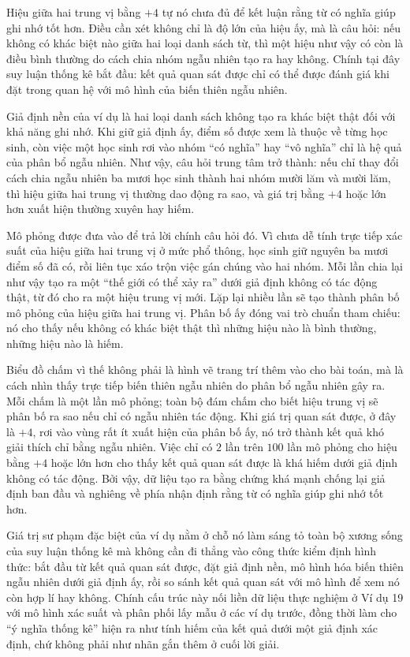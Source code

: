   {
    Hiệu giữa hai trung vị bằng $+4$ tự nó chưa đủ để kết luận rằng từ có nghĩa giúp ghi nhớ tốt hơn. Điều cần xét không chỉ là độ lớn của hiệu ấy, mà là câu hỏi: nếu không có khác biệt nào giữa hai loại danh sách từ, thì một hiệu như vậy có còn là điều bình thường do cách chia nhóm ngẫu nhiên tạo ra hay không. Chính tại đây suy luận thống kê bắt đầu: kết quả quan sát được chỉ có thể được đánh giá khi đặt trong quan hệ với mô hình của biến thiên ngẫu nhiên. 

    Giả định nền của ví dụ là hai loại danh sách không tạo ra khác biệt thật đối với khả năng ghi nhớ. Khi giữ giả định ấy, điểm số được xem là thuộc về từng học sinh, còn việc một học sinh rơi vào nhóm ``có nghĩa'' hay ``vô nghĩa'' chỉ là hệ quả của phân bổ ngẫu nhiên. Như vậy, câu hỏi trung tâm trở thành: nếu chỉ thay đổi cách chia ngẫu nhiên ba mươi học sinh thành hai nhóm mười lăm và mười lăm, thì hiệu giữa hai trung vị thường dao động ra sao, và giá trị bằng $+4$ hoặc lớn hơn xuất hiện thường xuyên hay hiếm. 

    Mô phỏng được đưa vào để trả lời chính câu hỏi đó. Vì chưa dễ tính trực tiếp xác suất của hiệu giữa hai trung vị ở mức phổ thông, học sinh giữ nguyên ba mươi điểm số đã có, rồi liên tục xáo trộn việc gán chúng vào hai nhóm. Mỗi lần chia lại như vậy tạo ra một “thế giới có thể xảy ra” dưới giả định không có tác động thật, từ đó cho ra một hiệu trung vị mới. Lặp lại nhiều lần sẽ tạo thành phân bố mô phỏng của hiệu giữa hai trung vị. Phân bố ấy đóng vai trò chuẩn tham chiếu: nó cho thấy nếu không có khác biệt thật thì những hiệu nào là bình thường, những hiệu nào là hiếm.

    Biểu đồ chấm vì thế không phải là hình vẽ trang trí thêm vào cho bài toán, mà là cách nhìn thấy trực tiếp biến thiên ngẫu nhiên do phân bổ ngẫu nhiên gây ra. Mỗi chấm là một lần mô phỏng; toàn bộ đám chấm cho biết hiệu trung vị sẽ phân bố ra sao nếu chỉ có ngẫu nhiên tác động. Khi giá trị quan sát được, ở đây là $+4$, rơi vào vùng rất ít xuất hiện của phân bố ấy, nó trở thành kết quả khó giải thích chỉ bằng ngẫu nhiên. Việc chỉ có $2$ lần trên $100$ lần mô phỏng cho hiệu bằng $+4$ hoặc lớn hơn cho thấy kết quả quan sát được là khá hiếm dưới giả định không có tác động. Bởi vậy, dữ liệu tạo ra bằng chứng khá mạnh chống lại giả định ban đầu và nghiêng về phía nhận định rằng từ có nghĩa giúp ghi nhớ tốt hơn.

    Giá trị sư phạm đặc biệt của ví dụ nằm ở chỗ nó làm sáng tỏ toàn bộ xương sống của suy luận thống kê mà không cần đi thẳng vào công thức kiểm định hình thức: bắt đầu từ kết quả quan sát được, đặt giả định nền, mô hình hóa biến thiên ngẫu nhiên dưới giả định ấy, rồi so sánh kết quả quan sát với mô hình để xem nó còn hợp lí hay không. Chính cấu trúc này nối liền dữ liệu thực nghiệm ở Ví dụ 19 với mô hình xác suất và phân phối lấy mẫu ở các ví dụ trước, đồng thời làm cho ``ý nghĩa thống kê'' hiện ra như tính hiếm của kết quả dưới một giả định xác định, chứ không phải như nhãn gắn thêm ở cuối lời giải.
  }

\CloseGrid